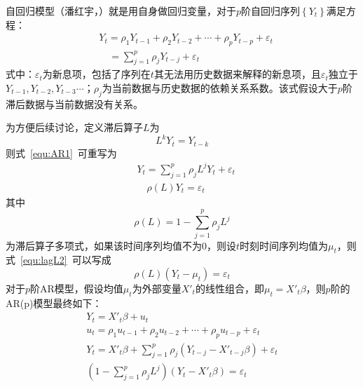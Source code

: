 自回归模型（潘红宇，\citeyear{cryer2011时间序列分析及应用}）就是用自身做回归变量，对于$p$阶自回归序列$\left\{ {{Y}_{t}} \right\}$满足方程：
\begin{align}
  \label{equ:AR1}
  & {{Y}_{t}}={{\rho }_{1}}{{Y}_{t-1}}+{{\rho }_{2}}{{Y}_{t-2}}+\cdots +{{\rho }_{p}}{{Y}_{t-p}}+{{\varepsilon }_{t}} \\ 
 & \quad =\sum\limits_{j=1}^{p}{{{\rho }_{j}}{{Y}_{t-j}}}+{{\varepsilon }_{t}} \nonumber
\end{align}
式中：${\varepsilon }_{t}$为新息项，包括了序列在$t$其无法用历史数据来解释的新息项，且${\varepsilon }_{t}$独立于${{Y}_{t-1}},{{Y}_{t-2}},{{Y}_{t-3}}\cdots $；${\rho }_{j}$为当前数据与历史数据的依赖关系系数。该式假设大于$p$阶滞后数据与当前数据没有关系。

为方便后续讨论，定义滞后算子$L$为
\begin{equation}
	\label{equ:lagL}
	{{L}^{k}}{{Y}_{t}}={{Y}_{t-k}}
\end{equation}
则式~\ref{equ:AR1}~可重写为
\begin{align}
  & {{Y}_{t}}=\sum\limits_{j=1}^{p}{{{\rho }_{j}}{{L}^{j}}{{Y}_{t}}}+{{\varepsilon }_{t}} \\ 
  \label{equ:lagL2}
 & \quad \rho (L){{Y}_{t}}={{\varepsilon }_{t}}
\end{align}
其中
\begin{equation}
	\label{equ:AR3}
	\rho (L)=1-\sum\limits_{j=1}^{p}{{{\rho }_{j}}{{L}^{j}}}
\end{equation}
为滞后算子多项式，如果该时间序列均值不为0，则设$t$时刻时间序列均值为${{\mu }_{t}}$，则式~\ref{equ:lagL2}~可以写成
\begin{equation}
	\rho (L)({{Y}_{t}}-{{\mu }_{t}})={{\varepsilon }_{t}}
\end{equation}
对于$p$阶AR模型，假设均值${{\mu }_{t}}$为外部变量${X'}_{t}$的线性组合，即${{\mu }_{t}}={{{X}'}_{t}}\beta $，则$p$阶的AR(p)模型最终如下：
\begin{gather}
  	{{Y}_{t}}={{{{X}'}}_{t}}\beta +{{u}_{t}} \\ 
 	{{u}_{t}}={{\rho }_{1}}{{u}_{t-1}}+{{\rho }_{2}}{{u}_{t-2}}+\cdots +{{\rho }_{p}}{{u}_{t-p}}+{{\varepsilon }_{t}} \\ 
 	{{Y}_{t}}={{{{X}'}}_{t}}\beta +\sum\limits_{j=1}^{p}{{{\rho }_{j}}({{Y}_{t-j}}-{{{{X}'}}_{t-j}}\beta )+}{{\varepsilon }_{t}} \\ 
 	\left( 1-\sum\limits_{j=1}^{p}{{{\rho }_{j}}{{L}^{j}}} \right)({{Y}_{t}}-{{{{X}'}}_{t}}\beta )={{\varepsilon }_{t}} 
\end{gather}

